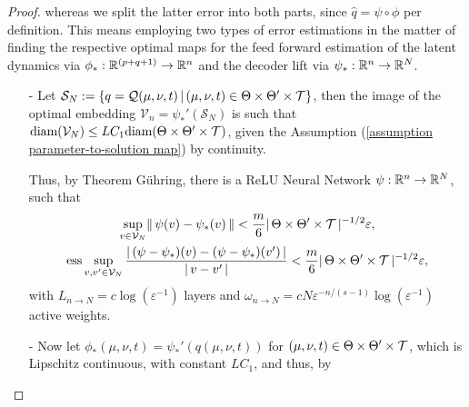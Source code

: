 \begin{proof}
    whereas we split the latter error into both parts, since $\hat{q} = \psi \circ \phi$ per definition. This means employing two types of error estimations
    in the matter of finding the respective optimal maps for the feed forward estimation of the latent dynamics via $\phi_*: \mathbb{R}^{(p+q+1)} \to \mathbb{R}^n$ 
    and the decoder lift via $\psi_*:\mathbb{R}^n \to \mathbb{R}^N$.
    \begin{enumerate}
        \item[-] Let $\mathcal{S}_N := \{q = \mathcal{Q}(\mu, \nu, t) \, \vert \, (\mu, \nu, t) \in \Theta \times \Theta' \times \mathcal{T} \}$, then the image of the optimal
        embedding $\mathcal{V}_n = \psi_*'(\mathcal{S}_N)$ is such that $\text{diam}(\mathcal{V}_N) \leq L C_1 \text{diam}(\Theta \times \Theta' \times \mathcal{T})$, given 
        the Assumption (\ref{assumption parameter-to-solution map}) by continuity.
        

        Thus, by Theorem Gühring, there is a ReLU Neural Network $\psi : \mathbb{R}^n \to \mathbb{R}^N$, such that
        \begin{gather} \label{eq: decoder error for pod-dl-rom}
            \sup\limits_{v \in \mathcal{V}_N} \lVert \, \psi(v) - \psi_*(v) \, \rVert < \frac{m}{6} \vert \, \Theta \times \Theta' \times \mathcal{T} \, \vert^{-1/2} \varepsilon, \\
            \operatorname{ess} \sup\limits_{v, v' \in \mathcal{V}_N} \frac{\vert \, (\psi - \psi_*)(v) - (\psi - \psi_*)(v') \, \vert}{\vert \, v - v' \, \vert} 
            < \frac{m}{6} \vert \, \Theta \times \Theta' \times \mathcal{T} \, \vert^{-1/2} \varepsilon,
        \end{gather}
        with $L_{n \to N} = c \log(\varepsilon^{-1})$ layers and $\omega_{n \to N} = c N \varepsilon^{-n/(s-1)} \log(\varepsilon^{-1})$ active weights.


        \item[-] Now let $\phi_*(\mu, \nu, t) = \psi_*'(q(\mu, \nu, t))$ for $(\mu, \nu, t) \in \Theta \times \Theta' \times \mathcal{T}$, which is 
        Lipschitz continuous, with constant $L C_1$, and thus, by 



\end{enumerate}
\end{proof}
